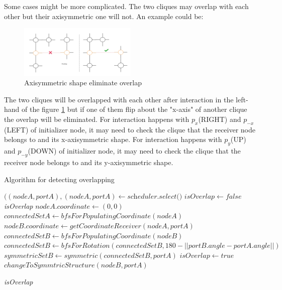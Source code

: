 \par\noindent
Some cases might be more complicated. The two cliques may overlap with each other but their axisymmetric one will not. An example could be:
\begin{figure}[H]
\begin{center}
\includegraphics[width = 0.5\textwidth]{context/diagram/overlap_flipping.pdf}
\caption{Axisymmetric shape eliminate overlap}
\label{overlap_flipping}
\end{center}
\end{figure}
\par\noindent
The two cliques will be overlapped with each other after interaction in the left-hand of the figure \ref{overlap_flipping} but if one of them
flip about the "x-axis" of another clique the overlap will be eliminated. For interaction happens with $p_{x}$(RIGHT) and $p_{-x}$(LEFT) of initializer node, it may need to check the
clique that the receiver node belongs to and its x-axisymmetric shape. For interaction happens with $p_{y}$(UP) and $p_{-y}$(DOWN) of initializer node, it may need to check the
clique that the receiver node belongs to and its y-axisymmetric shape.

\begin{algorithm}
\caption{Algorithm for detecting overlapping}\label{algo_do}
\begin{algorithmic}[1]

\State $((\textit{nodeA},\textit{portA}), (\textit{nodeA}, \textit{portA}) \gets \textit{scheduler.select()}$
\State $\textit{isOverlap} \gets false$
 \Return \textit{isOverlap}
\Else
    \State $ nodeA.coordinate \gets (0,0) $
    \State $ connectedSetA \gets bfsForPopulatingCoordinate(nodeA) $
    \State $ nodeB.coordinate \gets getCoordinateReceiver(nodeA, portA)$
    \State $ connectedSetB \gets bfsForPopulatingCoordinate(nodeB) $
    \State $ connectedSetB \gets bfsForRotation(connectedSetB, 180 - ||portB.angle - portA.angle||) $
    \State $ symmetricSetB \gets symmetric(connectedSetB, portA)$
      \State $\textit{isOverlap} \gets true$
    \Else
          \State $changeToSymmtricStructure(nodeB, portA)$
        \EndIf
    \EndIf
\EndIf

\Return \textit{isOverlap}

\EndProcedure
\end{algorithmic}
\end{algorithm}


